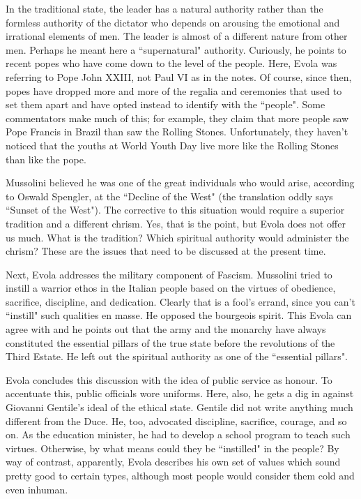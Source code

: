In the traditional state, the leader has a natural authority rather than the formless authority of the dictator who depends on arousing the emotional and irrational elements of men. The leader is almost of a different nature from other men. Perhaps he meant here a ``supernatural" authority. Curiously, he points to recent popes who have come down to the level of the people. Here, Evola was referring to Pope John XXIII, not Paul VI as in the notes. Of course, since then, popes have dropped more and more of the regalia and ceremonies that used to set them apart and have opted instead to identify with the ``people". Some commentators make much of this; for example, they claim that more people saw Pope Francis in Brazil than saw the Rolling Stones. Unfortunately, they haven't noticed that the youths at World Youth Day live more like the Rolling Stones than like the pope.

Mussolini believed he was one of the great individuals who would arise, according to Oswald Spengler, at the ``Decline of the West" (the translation oddly says ``Sunset of the West"). The corrective to this situation would require a superior tradition and a different chrism. Yes, that is the point, but Evola does not offer us much. What is the tradition? Which spiritual authority would administer the chrism? These are the issues that need to be discussed at the present time.

Next, Evola addresses the military component of Fascism. Mussolini tried to instill a warrior ethos in the Italian people based on the virtues of obedience, sacrifice, discipline, and dedication. Clearly that is a fool's errand, since you can't ``instill" such qualities en masse. He opposed the bourgeois spirit. This Evola can agree with and he points out that the army and the monarchy have always constituted the essential pillars of the true state before the revolutions of the Third Estate. He left out the spiritual authority as one of the ``essential pillars".

Evola concludes this discussion with the idea of public service as honour. To accentuate this, public officials wore uniforms. Here, also, he gets a dig in against Giovanni Gentile's ideal of the ethical state. Gentile did not write anything much different from the Duce. He, too, advocated discipline, sacrifice, courage, and so on. As the education minister, he had to develop a school program to teach such virtues. Otherwise, by what means could they be ``instilled" in the people? By way of contrast, apparently, Evola describes his own set of values which sound pretty good to certain types, although most people would consider them cold and even inhuman.

